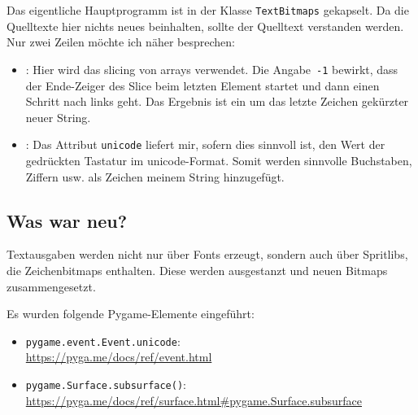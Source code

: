 

Das eigentliche Hauptprogramm ist in der Klasse \texttt{TextBitmaps} gekapselt. Da die Quelltexte hier nichts neues beinhalten, sollte der Quelltext verstanden werden. Nur zwei Zeilen möchte ich näher besprechen:

\begin{itemize}
    \item {}: Hier wird das \gls{slicing} von \glspl{array} verwendet. Die Angabe~\texttt{-1} bewirkt, dass der Ende-Zeiger des Slice beim letzten Element startet und dann einen Schritt nach links geht. Das Ergebnis ist ein um das letzte Zeichen gekürzter neuer String.

    \item {}: Das Attribut \texttt{unicode} liefert mir, sofern dies sinnvoll ist, den Wert der gedrückten Tastatur im \gls{unicode}-Format. Somit werden sinnvolle Buchstaben, Ziffern usw. als Zeichen meinem String hinzugefügt.
\end{itemize}





\newpage
\subsection*{Was war neu?}

Textausgaben werden nicht nur über Fonts erzeugt, sondern auch über Spritlibs, die Zeichenbitmaps enthalten. Diese werden ausgestanzt und neuen Bitmaps zusammengesetzt.

Es wurden folgende Pygame-Elemente eingeführt:

\begin{itemize}
	\item \texttt{pygame.event.Event.unicode}:
	\\ \url{https://pyga.me/docs/ref/event.html}

	\item \texttt{pygame.Surface.subsurface()}:
	\\ \url{https://pyga.me/docs/ref/surface.html#pygame.Surface.subsurface}
	
\end{itemize}
